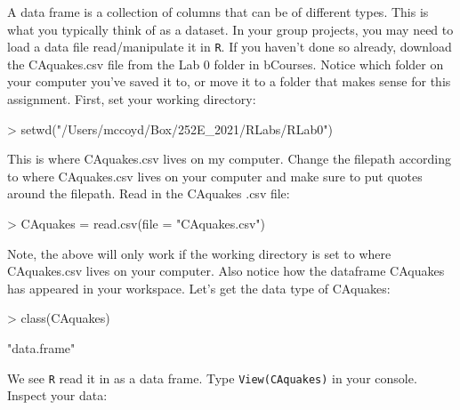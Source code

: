 \documentclass[answers]{exam}
\begin{document}
A data frame is a collection of columns that can be of different types. This is what you typically think of as a dataset. In your group projects, you may need to load a data file read/manipulate it in \texttt{R}. If you haven't done so already, download the CAquakes.csv file from the Lab 0 folder in bCourses. Notice which folder on your computer you've saved it to, or move it to a folder that makes sense for this assignment. First, set your working directory:
\begin{Schunk}
\begin{Sinput}
> setwd("/Users/mccoyd/Box/252E_2021/RLabs/RLab0")
\end{Sinput}
\end{Schunk}
\noindent This is where CAquakes.csv lives on my computer. Change the filepath according to where CAquakes.csv lives on your computer and make sure to put quotes around the filepath. Read in the CAquakes .csv file:
\begin{Schunk}
\begin{Sinput}
> CAquakes = read.csv(file = "CAquakes.csv")
\end{Sinput}
\end{Schunk}
\noindent Note, the above will only work if the working directory is set to where CAquakes.csv lives on your computer. Also notice how the dataframe CAquakes has appeared in your workspace. Let's get the data type of CAquakes:
\begin{Schunk}
\begin{Sinput}
> class(CAquakes)
\end{Sinput}
\begin{Soutput}
[1] "data.frame"
\end{Soutput}
\end{Schunk}
\noindent We see \texttt{R} read it in as a data frame. Type \texttt{View(CAquakes)} in your console. Inspect your data:
\end{document}
